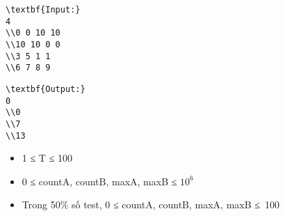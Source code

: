 \begin{verbatim}
\textbf{Input:}
4
\\0 0 10 10
\\10 10 0 0
\\3 5 1 1
\\6 7 8 9 \end{verbatim}
\begin{verbatim}
\textbf{Output:}
0
\\0
\\7
\\13 \end{verbatim}
\begin{itemize}
	\item     1 ≤ T ≤ 100   
	\item     0 ≤ countA, countB, maxA, maxB ≤ $10^{6}$
	\item     Trong 50\% số test, 0 ≤ countA, countB, maxA, maxB ≤ 100   
\end{itemize}